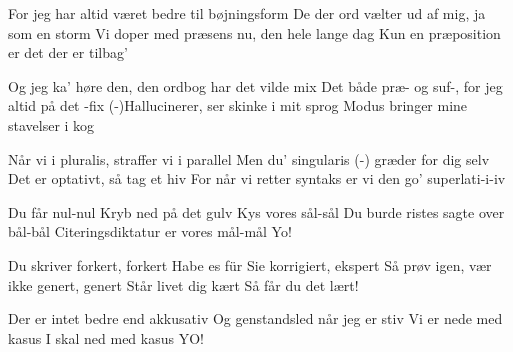 \documentclass[a4paper,11pt]{article}
\begin{document}
\begin{song}
For jeg har altid været bedre til bøjningsform
De der ord vælter ud af mig, ja som en storm
Vi doper med præsens nu, den hele lange dag
Kun en præposition er det der er tilbag'

Og jeg ka' høre den, den ordbog har det vilde mix
Det både præ- og suf-, for jeg altid på det -fix
(-)Hallucinerer, ser skinke i mit sprog
Modus bringer mine stavelser i kog

Når vi i pluralis, straffer vi i parallel
 Men du' singularis (-) græder for dig selv
 Det er optativt, så tag et hiv
 For når vi retter syntaks er vi den go' superlati-i-iv

Du får nul-nul
Kryb ned på det gulv
Kys vores sål-sål
Du burde ristes sagte over bål-bål
Citeringsdiktatur er vores mål-mål
Yo!

Du skriver forkert, forkert
Habe es für Sie korrigiert, ekspert 
Så prøv igen, vær ikke genert, genert
Står livet dig kært
Så får du det lært!

Der er intet bedre end akkusativ
Og genstandsled når jeg er stiv
Vi er nede med kasus
I skal ned med kasus
YO!

\end{song}
\end{document}
